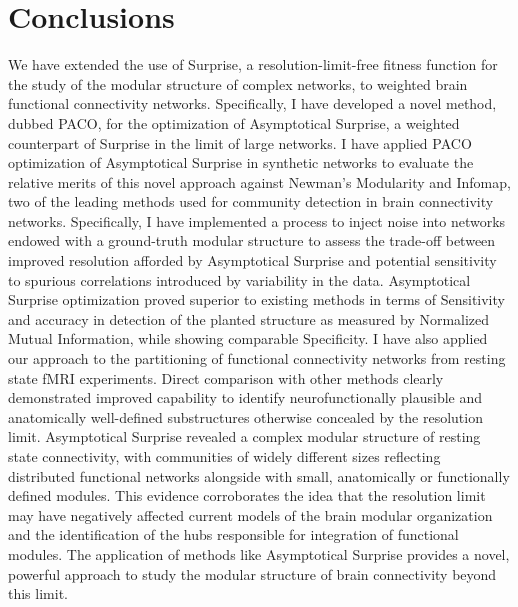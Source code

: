 \section{Conclusions}
We have extended the use of Surprise, a resolution-limit-free fitness function for the study of the modular structure of complex networks, to weighted brain functional connectivity networks. Specifically, I have developed a novel method, dubbed PACO, for the optimization of Asymptotical Surprise, a weighted counterpart of Surprise in the limit of large networks. I have applied PACO optimization of Asymptotical Surprise in synthetic networks to evaluate the relative merits of this novel approach against Newman's Modularity and Infomap, two of the leading methods used for community detection in brain connectivity networks. Specifically, I have implemented a process to inject noise into networks endowed with a ground-truth modular structure to assess the trade-off between improved resolution afforded by Asymptotical Surprise and potential sensitivity to spurious correlations introduced by variability in the data. Asymptotical Surprise optimization proved superior to existing methods in terms of Sensitivity and accuracy in detection of the planted structure as measured by Normalized Mutual Information, while showing comparable Specificity. I have also applied our approach to the partitioning of functional connectivity networks from resting state fMRI experiments. Direct comparison with other methods clearly demonstrated improved capability to identify neurofunctionally plausible and anatomically well-defined substructures otherwise concealed by the resolution limit. Asymptotical Surprise revealed a complex modular structure of resting state connectivity, with communities of widely different sizes reflecting distributed functional networks alongside with small, anatomically or functionally defined modules. This evidence corroborates the idea that the resolution limit may have negatively affected current models of the brain modular organization and the identification of the hubs responsible for integration of functional modules. 
The application of methods like Asymptotical Surprise provides a novel, powerful approach to study the modular structure of brain connectivity beyond this limit.
